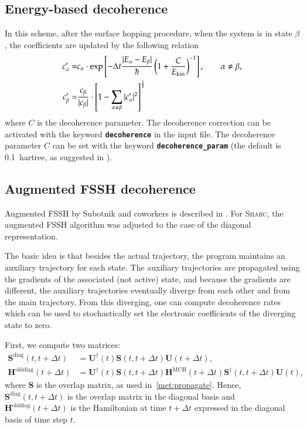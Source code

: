 \documentclass[a4paper,10pt,DIV=15,openany,twoside=false]{scrbook}
\newcommand{\sharc}{\textsc{Sharc}}
\newcommand{\ttt}[1]{\textbf{\texttt{#1}}}
\newcommand{\VEC}[1]{\ensuremath{\mathbf{#1}}}
\begin{document}
\subsection{Energy-based decoherence}

In this scheme, after the surface hopping procedure, when the system is in state $\beta$, the coefficients are updated by the following relation
\begin{align}
  c_\alpha^\prime=&
  c_\alpha\cdot\exp
  \left[
    -\Delta t\frac{|E_\alpha-E_\beta|}{\hbar}
    \left(
      1+\frac{C}{E_{\text{kin}}}
    \right)^{-1}
  \right],\qquad \alpha\neq\beta,\\
  c_\beta^\prime=&
  \frac{c_\beta}{|c_\beta|}\cdot
  \left[
    1-\sum\limits_{\alpha\neq\beta}^{\vphantom{\alpha}} |c^\prime_\alpha|^2
  \right]^{\frac{1}{2}}
\end{align}
where $C$ is the decoherence parameter. The decoherence correction can be activated with the keyword \ttt{decoherence} in the input file. The decoherence parameter $C$ can be set with the keyword \ttt{decoherence\_param} (the default is 0.1~hartree, as suggested in \cite{Granucci2010JCP}).



\subsection{Augmented FSSH decoherence}

Augmented FSSH by Subotnik and coworkers is described in \cite{Subotnik_todo}.
For \sharc, the augmented FSSH algorithm was adjusted to the case of the diagonal representation.

The basic idea is that besides the actual trajectory, the program maintains an auxiliary trajectory for each state.
The auxiliary trajectories are propagated using the gradients of the associated (not active) state, and because the gradients are different, the auxiliary trajectories eventually diverge from each other and from the main trajectory.
From this diverging, one can compute decoherence rates which can be used to stochastically set the electronic coefficients of the diverging state to zero.

First, we compute two matrices:
\begin{align}
  \VEC{S}^\text{diag}(t,t+\Delta t)&=\VEC{U}^\dagger(t)\VEC{S}(t,t+\Delta t)\VEC{U}(t+\Delta t),\\
  \VEC{H}^\text{olddiag}(t+\Delta t)&=\VEC{U}^\dagger(t)\VEC{S}(t,t+\Delta t)\VEC{H}^\text{MCH}(t+\Delta t)\VEC{S}^\dagger(t,t+\Delta t)\VEC{U}(t),
\end{align}
where $\VEC{S}$ is the overlap matrix, as used in~\ref{met:propagate}.
Hence, $\VEC{S}^\text{diag}(t,t+\Delta t)$ is the overlap matrix in the diagonal basis and $\VEC{H}^\text{olddiag}(t+\Delta t)$ is the Hamiltonian at time $t+\Delta t$ expressed in the diagonal basis of time step $t$.
\end{document}
